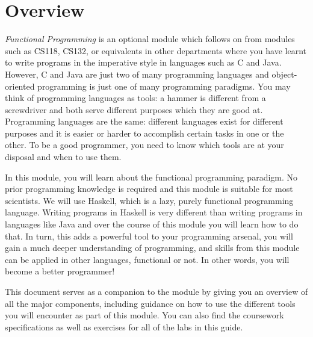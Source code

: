 \chapter{Overview}

\emph{Functional Programming} is an optional module which follows on from modules such as CS118, CS132, or equivalents in other departments where you have learnt to write programs in the imperative style in languages such as C and Java. However, C and Java are just two of many programming languages and object-oriented programming is just one of many programming paradigms. You may think of programming languages as tools: a hammer is different from a screwdriver and both serve different purposes which they are good at. Programming languages are the same: different languages exist for different purposes and it is easier or harder to accomplish certain tasks in one or the other. To be a good programmer, you need to know which tools are at your disposal and when to use them.

In this module, you will learn about the functional programming paradigm. No prior programming knowledge is required and this module is suitable for most scientists. We will use Haskell, which is a lazy, purely functional programming language. Writing programs in Haskell is very different than writing programs in languages like Java and over the course of this module you will learn how to do that. In turn, this adds a powerful tool to your programming arsenal, you will gain a much deeper understanding of programming, and skills from this module can be applied in other languages, functional or not. In other words, you will become a better programmer!

This document serves as a companion to the module by giving you an overview of all the major components, including guidance on how to use the different tools you will encounter as part of this module. You can also find the coursework specifications as well as exercises for all of the labs in this guide.